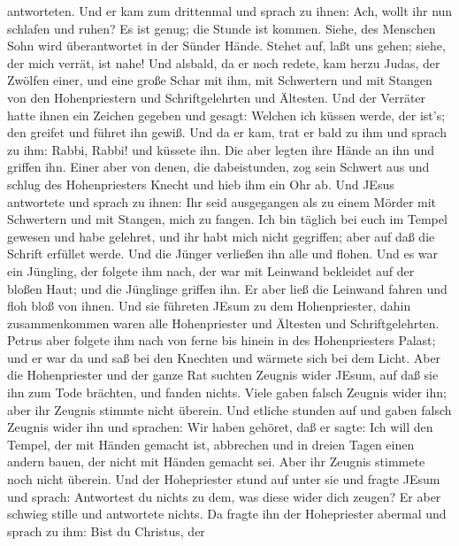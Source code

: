 antworteten.  Und er kam zum drittenmal und sprach zu
ihnen: Ach, wollt ihr nun schlafen und ruhen? Es ist genug; die Stunde
ist kommen. Siehe, des Menschen Sohn wird überantwortet in der Sünder
Hände.  Stehet auf, laßt uns gehen; siehe, der mich verrät,
ist nahe!  Und alsbald, da er noch redete, kam herzu Judas,
der Zwölfen einer, und eine große Schar mit ihm, mit Schwertern und mit
Stangen von den Hohenpriestern und Schriftgelehrten und Ältesten.
 Und der Verräter hatte ihnen ein Zeichen gegeben und
gesagt: Welchen ich küssen werde, der ist's; den greifet und führet ihn
gewiß.  Und da er kam, trat er bald zu ihm und sprach zu
ihm: Rabbi, Rabbi! und küssete ihn.  Die aber legten ihre
Hände an ihn und griffen ihn.  Einer aber von denen, die
dabeistunden, zog sein Schwert aus und schlug des Hohenpriesters Knecht
und hieb ihm ein Ohr ab.  Und JEsus antwortete und sprach
zu ihnen: Ihr seid ausgegangen als zu einem Mörder mit Schwertern und
mit Stangen, mich zu fangen.  Ich bin täglich bei euch im
Tempel gewesen und habe gelehret, und ihr habt mich nicht gegriffen;
aber auf daß die Schrift erfüllet werde.  Und die Jünger
verließen ihn alle und flohen.  Und es war ein Jüngling,
der folgete ihm nach, der war mit Leinwand bekleidet auf der bloßen
Haut; und die Jünglinge griffen ihn.  Er aber ließ die
Leinwand fahren und floh bloß von ihnen.  Und sie führeten
JEsum zu dem Hohenpriester, dahin zusammenkommen waren alle
Hohenpriester und Ältesten und Schriftgelehrten.  Petrus
aber folgete ihm nach von ferne bis hinein in des Hohenpriesters Palast;
und er war da und saß bei den Knechten und wärmete sich bei dem Licht.
 Aber die Hohenpriester und der ganze Rat suchten Zeugnis
wider JEsum, auf daß sie ihn zum Tode brächten, und fanden nichts.
 Viele gaben falsch Zeugnis wider ihn; aber ihr Zeugnis
stimmte nicht überein.  Und etliche stunden auf und gaben
falsch Zeugnis wider ihn und sprachen:  Wir haben gehöret,
daß er sagte: Ich will den Tempel, der mit Händen gemacht ist, abbrechen
und in dreien Tagen einen andern bauen, der nicht mit Händen gemacht
sei.  Aber ihr Zeugnis stimmete noch nicht überein.
 Und der Hohepriester stund auf unter sie und fragte JEsum
und sprach: Antwortest du nichts zu dem, was diese wider dich zeugen?
 Er aber schwieg stille und antwortete nichts. Da fragte
ihn der Hohepriester abermal und sprach zu ihm: Bist du Christus, der
